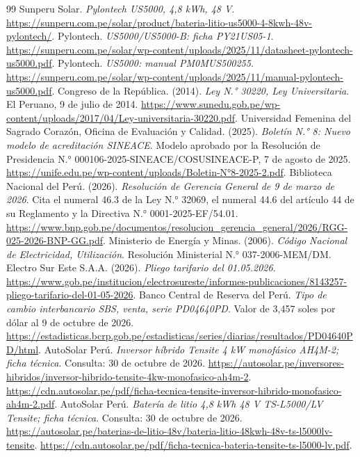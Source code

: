 \begin{thebibliography}{99}
 Sunperu Solar. \emph{Pylontech US5000, 4,8 kWh, 48 V}. \url{https://sunperu.com.pe/solar/product/bateria-litio-us5000-4-8kwh-48v-pylontech/}.
 Pylontech. \emph{US5000/US5000-B: ficha PY21US05-1}. \url{https://sunperu.com.pe/solar/wp-content/uploads/2025/11/datasheet-pylontech-us5000.pdf}.
 Pylontech. \emph{US5000: manual PM0MUS500255}. \url{https://sunperu.com.pe/solar/wp-content/uploads/2025/11/manual-pylontech-us5000.pdf}.
 Congreso de la República. (2014). \emph{Ley N.° 30220, Ley Universitaria}. El Peruano, 9 de julio de 2014. \url{https://www.sunedu.gob.pe/wp-content/uploads/2017/04/Ley-universitaria-30220.pdf}.
 Universidad Femenina del Sagrado Corazón, Oficina de Evaluación y Calidad. (2025). \emph{Boletín N.° 8: Nuevo modelo de acreditación SINEACE}. Modelo aprobado por la Resolución de Presidencia N.° 000106-2025-SINEACE/COSUSINEACE-P, 7 de agosto de 2025. \url{https://unife.edu.pe/wp-content/uploads/Boletin-N°8-2025-2.pdf}.
 Biblioteca Nacional del Perú. (2026). \emph{Resolución de Gerencia General de 9 de marzo de 2026}. Cita el numeral 46.3 de la Ley N.° 32069, el numeral 44.6 del artículo 44 de su Reglamento y la Directiva N.° 0001-2025-EF/54.01. \url{https://www.bnp.gob.pe/documentos/resolucion_gerencia_general/2026/RGG-025-2026-BNP-GG.pdf}.
 Ministerio de Energía y Minas. (2006). \emph{Código Nacional de Electricidad, Utilización}. Resolución Ministerial N.° 037-2006-MEM/DM.
 Electro Sur Este S.A.A. (2026). \emph{Pliego tarifario del 01.05.2026}. \url{https://www.gob.pe/institucion/electrosureste/informes-publicaciones/8143257-pliego-tarifario-del-01-05-2026}.
 Banco Central de Reserva del Perú. \emph{Tipo de cambio interbancario SBS, venta, serie PD04640PD}. Valor de 3,457 soles por dólar al 9 de octubre de 2026. \url{https://estadisticas.bcrp.gob.pe/estadisticas/series/diarias/resultados/PD04640PD/html}.
 AutoSolar Perú. \emph{Inversor híbrido Tensite 4 kW monofásico AH4M-2; ficha técnica}. Consulta: 30 de octubre de 2026. \url{https://autosolar.pe/inversores-hibridos/inversor-hibrido-tensite-4kw-monofasico-ah4m-2}. \url{https://cdn.autosolar.pe/pdf/ficha-tecnica-tensite-inversor-hibrido-monofasico-ah4m-2.pdf}.
 AutoSolar Perú. \emph{Batería de litio 4,8 kWh 48 V TS-L5000/LV Tensite; ficha técnica}. Consulta: 30 de octubre de 2026. \url{https://autosolar.pe/baterias-de-litio-48v/bateria-litio-48kwh-48v-ts-l5000lv-tensite}. \url{https://cdn.autosolar.pe/pdf/ficha-tecnica-bateria-tensite-ts-l5000-lv.pdf}.

\end{thebibliography}
